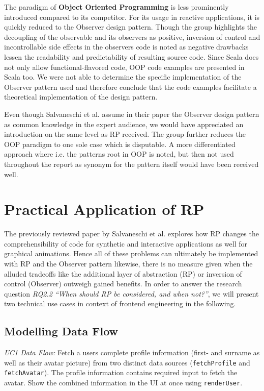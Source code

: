 \documentclass[12pt,a4paper]{article}
\begin{document}
The paradigm of \textbf{Object Oriented Programming} is less prominently introduced compared to its competitor. For its usage in reactive applications, it is quickly reduced to the Observer design pattern. Though the group highlights the decoupling of the observable and its observers as positive, inversion of control and incontrollable side effects in the observers code is noted as negative drawbacks lessen the readability and predictability of resulting source code. Since Scala does not only allow functional-flavored code, OOP code examples are presented in Scala too. We were not able to determine the specific implementation of the Observer pattern used and therefore conclude that the code examples facilitate a theoretical implementation of the design pattern.

Even though Salvaneschi et al. assume in their paper the Observer design pattern as common knowledge in the expert audience, we would have appreciated an introduction on the same level as RP received. The group further reduces the OOP paradigm to one sole case which is disputable. A more differentiated approach where i.e. the patterns root in OOP is noted, but then not used throughout the report as synonym for the pattern itself would have been received well.

\section{Practical Application of RP}
\label{sec:practical-application}

The previously reviewed paper by Salvaneschi et al. explores how RP changes the comprehensibility of code for synthetic and interactive applications as well for graphical animations. Hence all of these problems can ultimately be implemented with RP and the Observer pattern likewise, there is no measure given when the alluded tradeoffs like the additional layer of abstraction (RP) or inversion of control (Observer) outweigh gained benefits. In order to answer the research question \emph{RQ2.2 ``When should RP be considered, and when not?''}, we will present two technical use cases in context of frontend engineering in the following.

\subsection{Modelling Data Flow}

\begin{framed}
	\noindent\emph{UC1 Data Flow:} Fetch a users complete profile information (first- and surname as well as their avatar picture) from two distinct data sources (\texttt{fetchProfile} and \texttt{fetchAvatar}). The profile information contains required input to fetch the avatar. Show the combined information in the UI at once using \texttt{renderUser}.
\end{framed}
\end{document}
